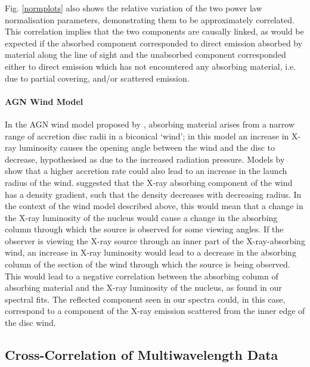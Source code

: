 \documentclass[letters,useAMS,usenatbib]{samnote}
\begin{document}
Fig. \ref{normplots} also shows the relative variation of the two power law normalisation parameters, demonstrating them to be approximately correlated.
This correlation implies that the two components are causally linked, as would be expected if the absorbed component corresponded to direct emission absorbed by material
along the line of sight and the unabsorbed component corresponded either to direct emission which has not encountered any absorbing material, i.e. due to partial
covering, and/or scattered emission.				
 



\paragraph{AGN Wind Model}


In the AGN wind model proposed by \citet{elvis}, absorbing material arises from a narrow range of accretion disc radii in a biconical `wind'; in this model
an increase in X-ray luminosity causes the opening angle between the wind and the disc to decrease, hypothesised as due to the increased radiation pressure. Models by
\citet{nicastro} show that a higher accretion rate could also lead to an increase in the launch radius of the wind. \citet{tombesi} suggested that the X-ray absorbing
component of the wind has a density gradient, such that the density decreases with decreasing radius. In the context of the wind model described above, this would mean
that a change in the X-ray luminosity of the nucleus would cause a change in the absorbing column through which the source is observed for some viewing angles. If the
observer is viewing the X-ray source through an inner part of the X-ray-absorbing wind, an increase in X-ray luminosity would lead to a decrease in the absorbing column
of the section of the wind through which the source is being observed. This would lead to a negative correlation between the absorbing column of absorbing material and
the X-ray luminosity of the nucleus, as found in our spectral fits. The reflected component seen in our spectra could, in this case, correspond to a component of the
X-ray emission scattered from the inner edge of the disc wind.

\clearpage


\subsection{Cross-Correlation of Multiwavelength Data}
\end{document}
